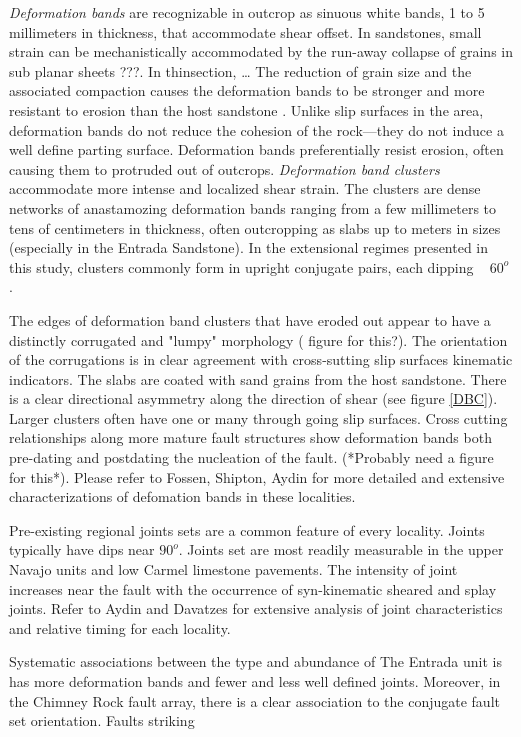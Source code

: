 \documentclass[12pt,a4paper]{article}
\begin{document}
\textit{Deformation bands} are recognizable in outcrop as sinuous white bands, 1 to 5 millimeters in thickness, that accommodate shear offset. In sandstones, small strain can be mechanistically accommodated by the run-away collapse of grains in sub planar sheets \cite{shipton} ???. In thinsection, …  The reduction of grain size and the associated compaction causes the deformation bands to be stronger and more resistant to erosion than the host sandstone \cite{fossen}. Unlike slip surfaces in the area, deformation bands do not reduce the cohesion of the rock—they do not induce a well define parting surface. Deformation bands preferentially resist erosion, often causing them to protruded out of outcrops. \textit{Deformation band clusters} accommodate more intense and localized shear strain. The clusters are dense networks of anastamozing deformation bands ranging from a few millimeters to tens of centimeters in thickness, often outcropping as slabs up to meters in sizes (especially in the Entrada Sandstone). In the extensional regimes presented in this study, clusters commonly form in upright conjugate pairs, each dipping ~ $60^o$.   

The edges of deformation band clusters that have eroded out appear to have a distinctly corrugated and "lumpy" morphology ( figure for this?). The orientation of the corrugations is in clear agreement with cross-sutting slip surfaces kinematic indicators.  The slabs are coated with sand grains from the host sandstone. There is a clear directional asymmetry along the direction of shear (see figure \ref{DBC}). Larger clusters often have one or many through going slip surfaces. Cross cutting relationships along more mature fault structures show deformation bands both pre-dating and postdating the nucleation of the fault. (*Probably need a figure for this*). Please refer to Fossen, Shipton, Aydin for more detailed and extensive characterizations of defomation bands in these localities.

Pre-existing regional joints sets are a common feature of every locality.  Joints typically have dips near $90^o$. Joints set are most readily measurable in the upper Navajo units and low Carmel limestone pavements. The intensity of joint increases near the fault with the occurrence of syn-kinematic sheared and splay joints. Refer to Aydin and Davatzes for extensive analysis of joint characteristics and relative timing for each locality.

Systematic associations between the type and abundance of The Entrada unit is has more deformation bands and fewer and less well defined joints. Moreover, in the Chimney Rock fault array, there is a clear association to the conjugate fault set orientation. Faults striking 
\end{document}
